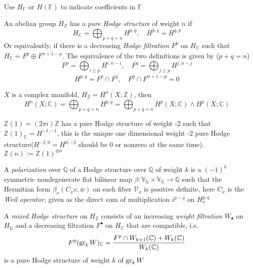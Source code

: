 \documentclass[main]{subfiles}
\begin{document}
Use $H_{\mathbb F}$ or $H(\mathbb F)$ to indicate coefficients in $\mathbb F$

\begin{definition}
An abelian group $H_{\mathbb Z}$ has a \textit{pure Hodge structure} of weight $n$ if
\[H_{\mathbb C}=\displaystyle\bigoplus_{p+q=n}H^{p,q},\quad\overline{H^{p,q}}=H^{q,p}\]
Or equivalently, if there is a decreasing \textit{Hodge filtration} $F^p$ on $H_{\mathbb C}$ such that $H_{\mathbb C}=F^p\oplus\overline{F^{n+1-p}}$. The equivalence of the two definitions is given by ($p+q=n$)
\[F^p=\displaystyle\bigoplus_{i\geq p}H^{i,n-i},\quad \overline{F^q}=\displaystyle\bigoplus_{j\leq p}H^{j,n-j}\]
\[H^{p,q}=F^p\cap\overline{F^q},\quad F^p\cap\overline{F^{n+1-p}}=0\]
\end{definition}

\begin{example}
$X$ is a complex manifold, $H_{\mathbb Z}=H^n(X;\mathbb Z)$, then
\[H^n(X;\mathbb C)=\bigoplus_{p+q=n}H^{p,q}=\bigoplus_{p+q=n}H^p(X;\mathbb C)\wedge \overline{H^p(X;\mathbb C)}\]
\end{example}

\begin{example}
$\mathbb Z(1)=(2\pi i)\mathbb Z$ has a pure Hodge structure of weight -2 such that $\mathbb Z(1)_{\mathbb C}=H^{-1,-1}$, this is the unique one dimensional weight -2 pure Hodge structure($H^{-2,0}=\overline{H^{0,-2}}$ should be 0 or nonzero at the same time). $\mathbb Z(n):=\mathbb Z(1)^{\otimes n}$
\end{example}

\begin{definition}
A \textit{polarization} over $\mathbb Q$ of a Hodge structure over $\mathbb Q$ of weight $k$ is a $(-1)^k$ symmetric nondegenerate flat bilinear map $\beta:\mathbb V_{\mathbb Q}\times\mathbb V_{\mathbb Q}\to\mathbb Q$ such that the Hermitian form $\beta_x(C_xv,\bar w)$ on each fiber $\mathcal V_x$ is positive definite, here $C_x$ is the \textit{Weil operator}, given as the direct sum of multiplication $i^{p-q}$ on $H^{p,q}_x$
\end{definition}

\begin{definition}
A \textit{mixed Hodge structure} on $H_{\mathbb Z}$ consists of an increasing \textit{weight filtration} $W_\bullet$ on $H_{\mathbb Q}$ and a decreasing filtration $F^\bullet$ on $H_{\mathbb C}$ that are compatible, i.e.
\[F^p(\operatorname{gr}_kW)_{\mathbb C}=\frac{F^p\cap W_{k+1}(\mathbb C)+W_k(\mathbb C)}{W_k(\mathbb C)}\]
is a pure Hodge structure of weight $k$ of $\operatorname{gr}_kW$
\end{definition}
\end{document}
